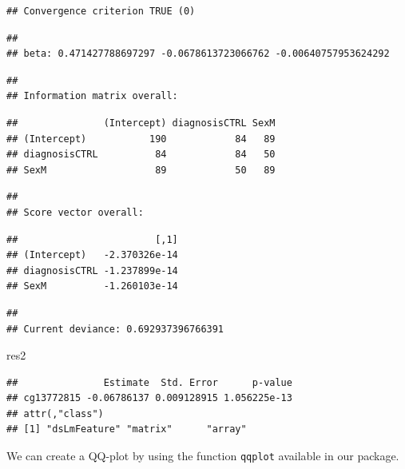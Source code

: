 \documentclass[
]{book}
\newenvironment{Shaded}{\begin{snugshade}}{\end{snugshade}}
\newcommand{\FunctionTok}[1]{\textcolor[rgb]{0.00,0.00,0.00}{#1}}
\newcommand{\NormalTok}[1]{#1}
\newcommand{\SpecialCharTok}[1]{\textcolor[rgb]{0.00,0.00,0.00}{#1}}
\begin{document}
\begin{verbatim}
## Convergence criterion TRUE (0)
\end{verbatim}

\begin{verbatim}
## 
## beta: 0.471427788697297 -0.0678613723066762 -0.00640757953624292
\end{verbatim}

\begin{verbatim}
## 
## Information matrix overall:
\end{verbatim}

\begin{verbatim}
##               (Intercept) diagnosisCTRL SexM
## (Intercept)           190            84   89
## diagnosisCTRL          84            84   50
## SexM                   89            50   89
\end{verbatim}

\begin{verbatim}
## 
## Score vector overall:
\end{verbatim}

\begin{verbatim}
##                        [,1]
## (Intercept)   -2.370326e-14
## diagnosisCTRL -1.237899e-14
## SexM          -1.260103e-14
\end{verbatim}

\begin{verbatim}
## 
## Current deviance: 0.692937396766391
\end{verbatim}

\begin{Shaded}
\begin{Highlighting}[]
\NormalTok{res2}
\end{Highlighting}
\end{Shaded}

\begin{verbatim}
##               Estimate  Std. Error      p-value
## cg13772815 -0.06786137 0.009128915 1.056225e-13
## attr(,"class")
## [1] "dsLmFeature" "matrix"      "array"
\end{verbatim}

We can create a QQ-plot by using the function \texttt{qqplot} available in our package.

\begin{Shaded}
\end{Shaded}
\end{document}
